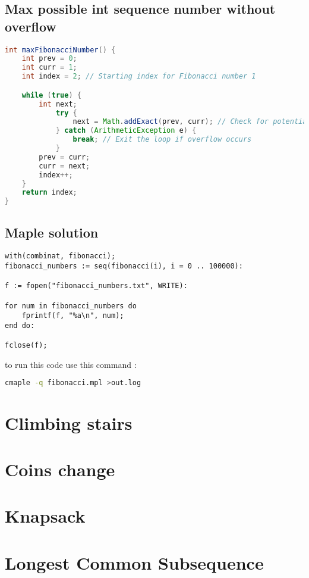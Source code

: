 \documentclass{article}
\begin{document}
\subsection{Max possible int sequence number without overflow}
\begin{lstlisting}[language=Java]
int maxFibonacciNumber() {
	int prev = 0;
	int curr = 1;
	int index = 2; // Starting index for Fibonacci number 1

	while (true) {
		int next;
			try {
				next = Math.addExact(prev, curr); // Check for potential integer overflow
			} catch (ArithmeticException e) {
				break; // Exit the loop if overflow occurs
			}
		prev = curr;
		curr = next;
		index++;
	}
	return index;
}
\end{lstlisting}

\subsection{Maple solution}
\begin{lstlisting}[language=Maple]
with(combinat, fibonacci);
fibonacci_numbers := seq(fibonacci(i), i = 0 .. 100000):

f := fopen("fibonacci_numbers.txt", WRITE):

for num in fibonacci_numbers do
	fprintf(f, "%a\n", num);
end do:

fclose(f);
\end{lstlisting}

to run this code use this command :
\begin{lstlisting}[language=bash]
cmaple -q fibonacci.mpl >out.log
\end{lstlisting}


\section{Climbing stairs}

\section{Coins change}

\section{Knapsack}

\section{Longest Common Subsequence}
\end{document}
